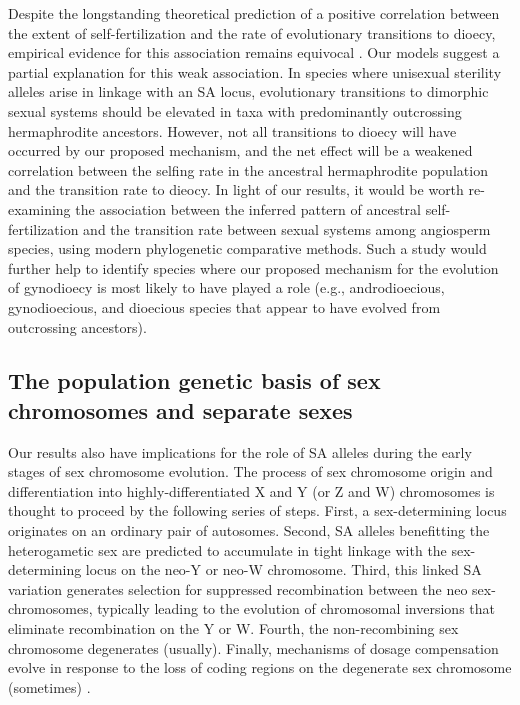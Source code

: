 \documentclass{article}
\begin{document}
Despite the longstanding theoretical prediction of a positive correlation between the extent of self-fertilization and the rate of evolutionary transitions to dioecy, empirical evidence for this association remains equivocal \citep{Charlesworth1985, Charlesworth2006, Renner2014}. Our models suggest a partial explanation for this weak association. In species where unisexual sterility alleles arise in linkage with an SA locus, evolutionary transitions to dimorphic sexual systems should be elevated in taxa with predominantly outcrossing hermaphrodite ancestors. However, not all transitions to dioecy will have occurred by our proposed mechanism, and the net effect will be a weakened correlation between the selfing rate in the ancestral hermaphrodite population and the transition rate to dieocy. In light of our results, it would be worth re-examining the association between the inferred pattern of ancestral self-fertilization and the transition rate between sexual systems among angiosperm species, using modern phylogenetic comparative methods. Such a study would further help to identify species where our proposed mechanism for the evolution of gynodioecy is most likely to have played a role (e.g., androdioecious, gynodioecious, and dioecious species that appear to have evolved from outcrossing ancestors).


\subsection*{The population genetic basis of sex chromosomes and separate sexes}

Our results also have implications for the role of SA alleles during the early stages of sex chromosome evolution. The process of sex chromosome origin and differentiation into highly-differentiated X and Y (or Z and W) chromosomes is thought to proceed by the following series of steps. First, a sex-determining locus originates on an ordinary pair of autosomes. Second, SA alleles benefitting the heterogametic sex are predicted to accumulate in tight linkage with the sex-determining locus on the neo-Y or neo-W chromosome. Third, this linked SA variation generates selection for suppressed recombination between the neo sex-chromosomes, typically leading to the evolution of chromosomal inversions that eliminate recombination on the Y or W. Fourth, the non-recombining sex chromosome degenerates (usually). Finally, mechanisms of dosage compensation evolve in response to the loss of coding regions on the degenerate sex chromosome (sometimes) \citep{Rice1987,Charlesworth2002,Bachtrog2006,Qiuetal2013,Bachtrog2014}. 
\end{document}
